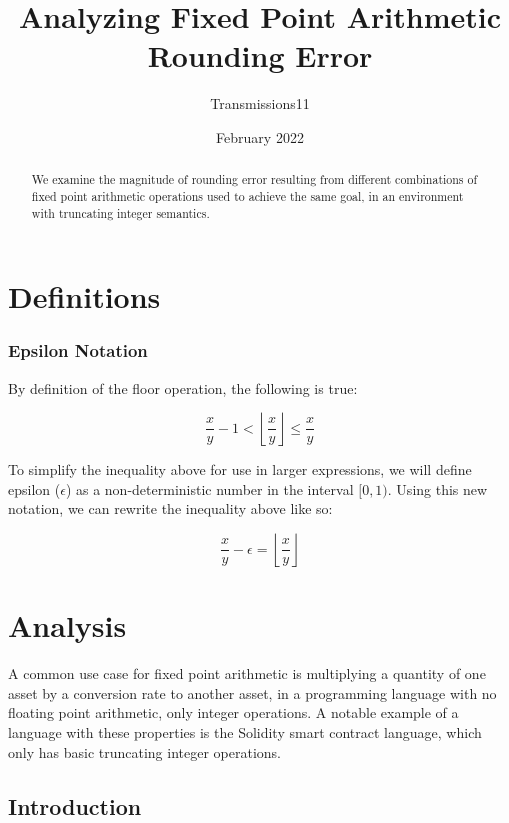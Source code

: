 \documentclass{article}
\title{\textbf{Analyzing Fixed Point Arithmetic Rounding Error}}
\author{Transmissions11}
\date{February 2022}
\begin{document}
\maketitle

\begin{abstract}

We examine the magnitude of rounding error resulting from different combinations of fixed point arithmetic operations used to achieve the same goal, in an environment with truncating integer semantics.

\end{abstract}

\tableofcontents

\section{Definitions}

\subsubsection{Epsilon Notation}

By definition of the floor operation, the following is true:

$$ \frac{x}{y} - 1 < \left\lfloor\frac{x}{y}\right\rfloor \leq \frac{x}{y} $$

To simplify the inequality above for use in larger expressions, we will define epsilon ($\epsilon$) as a non-deterministic number in the interval $[0, 1)$. Using this new notation, we can rewrite the inequality above like so:

$$ \frac{x}{y} - \epsilon = \left\lfloor\frac{x}{y}\right\rfloor $$

\section{Analysis}

A common use case for fixed point arithmetic is multiplying a quantity of one asset by a conversion rate to another asset, in a programming language with no floating point arithmetic, only integer operations. A notable example of a language with these properties is the Solidity smart contract language, which only has basic truncating integer operations.

\subsection{Introduction}
\end{document}
